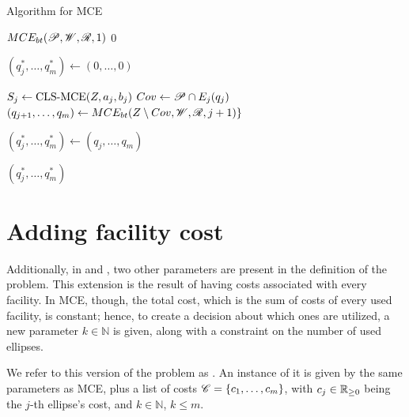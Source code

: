 \begin{algoritmo}
	\caption{Algorithm for MCE}\label{algoritmo:mce2}
	
	\begin{algorithmic}[1]
		
		
		\item[]
		\State \Return $MCE_{bt}(\mathscr{P}, \mathscr{W}, \mathscr{R}, 1)$
		\EndProcedure
		\State
		\State \Return $0$
		\EndIf
		
		\State $(q_j^*, \dots, q_m^*) \gets (0, \dots, 0)$
		
		\State $S_j \gets \textnormal{CLS-MCE}(Z, a_j, b_j)$
		\State $Cov \gets \mathscr{P} \cap E_j(q_j)$
		\State $(q_{j+1}, \dots, q_m) \gets MCE_{bt}(Z \setminus Cov, \mathscr{W}, \mathscr{R}, j+1)\}$
		
		\State $(q_j^*, \dots, q_m^*) \gets(q_j, \dots, q_m)$
		\EndIf
		\EndFor
		
		\State \Return $(q_j^*, \dots, q_m^*)$
		\EndProcedure
	\end{algorithmic}
\end{algoritmo}


\section{Adding facility cost}

Additionally, in  and , two other parameters are present in the definition of the problem. This extension is the result of having costs associated with every facility.
In MCE, though, the total cost, which is the sum of costs of every used facility, is constant; hence, to create a decision about which ones are utilized, a new parameter $k\in\mathbb{N}$ is given, along with a constraint on the number of used ellipses.

We refer to this version of the problem as  . An instance of it is given by the same parameters as MCE, plus a list of costs $\mathscr{C}=\{c_1, \dots, c_m\}$, with $c_j\in\mathbb{R}_{\ge0}$ being the $j$-th ellipse's cost, and $k\in\mathbb{N}$, $k\le m$.

